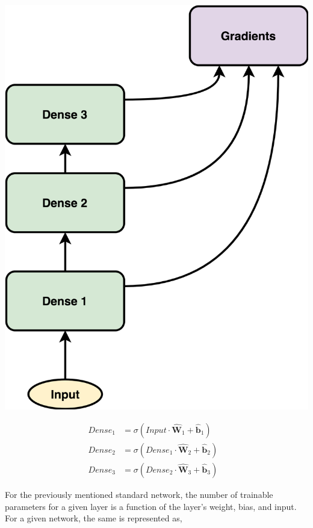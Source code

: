 \documentclass{article}
\let\oldhat\hat
\renewcommand{\hat}[1]{\oldhat{\mathbf{#1}}}
\begin{document}
\noindent\begin{minipage}{.45\textwidth}
   \centering
   \includegraphics[scale=0.09]{SimpleFFN.png}
   \label{fig:SimpleFFN.png}
\end{minipage}
\begin{minipage}{.45\textwidth}
\begin{equation}
\label{eq:ffn_math_representation}
\begin{aligned}
   Dense_{1} &= \sigma(Input \cdot \hat{W}_{1} + \hat{b}_{1}) &\\
   Dense_{2} &= \sigma(Dense_{1} \cdot \hat{W}_{2} + \hat{b}_{2}) &\\
   Dense_{3} &= \sigma(Dense_{2} \cdot \hat{W}_{3} + \hat{b}_{3}) 
\end{aligned}
\end{equation}
\end{minipage}

For the previously mentioned standard network, the number of trainable parameters for a given layer is a function of the layer's weight, bias, and input. For a given network, the same is represented as, 
\end{document}
